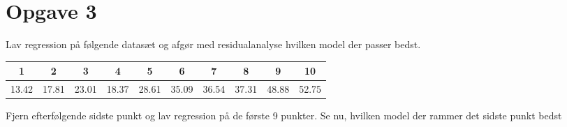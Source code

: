 \section*{Opgave 3}
Lav regression på følgende datasæt og afgør med residualanalyse hvilken model der passer bedst.
\begin{center}
\begin{tabular}{c|c|c|c|c|c|c|c|c|c}
1 & 2 & 3 & 4 & 5 & 6 & 7 & 8 & 9 & 10\\ \hline
13.42& 17.81& 23.01& 18.37& 28.61& 35.09&
 36.54 &37.31& 48.88& 52.75
\end{tabular}
\end{center}
Fjern efterfølgende sidste punkt og lav regression på de første 9 punkter. Se nu, hvilken model der rammer det sidste punkt bedst
